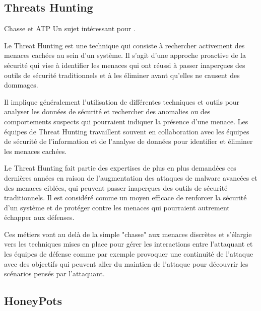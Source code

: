 \subsection{Threats Hunting}


\begin{techworkbox}{Chasse et ATP}
Un sujet intéressant pour \fichetech.\end{techworkbox}

Le Threat Hunting est une technique qui consiste à rechercher activement des menaces cachées au sein d'un système. Il s'agit d'une approche proactive de la sécurité qui vise à identifier les menaces qui ont réussi à passer inaperçues des outils de sécurité traditionnels et à les éliminer avant qu'elles ne causent des dommages.

Il implique généralement l'utilisation de différentes techniques et outils pour analyser les données de sécurité et rechercher des anomalies ou des comportements suspects qui pourraient indiquer la présence d'une menace. Les équipes de Threat Hunting travaillent souvent en collaboration avec les équipes de sécurité de l'information et de l'analyse de données pour identifier et éliminer les menaces cachées.

Le Threat Hunting fait partie des expertises de plus en plus demandées ces dernières années en raison de l'augmentation des attaques de malware avancées et des menaces ciblées, qui peuvent passer inaperçues des outils de sécurité traditionnels. Il est considéré comme un moyen efficace de renforcer la sécurité d'un système et de protéger contre les menaces qui pourraient autrement échapper aux défenses.

Ces métiers vont au delà de la simple "chasse" aux menaces discrètes et s'élargie vers les techniques mises en place pour gérer les interactions entre l'attaquant et les équipes de défense comme par exemple provoquer une continuité de l'attaque avec des objectifs qui peuvent aller du maintien de l'attaque pour découvrir les scénarios pensés par l'attaquant.
%

\subsection{HoneyPots}

